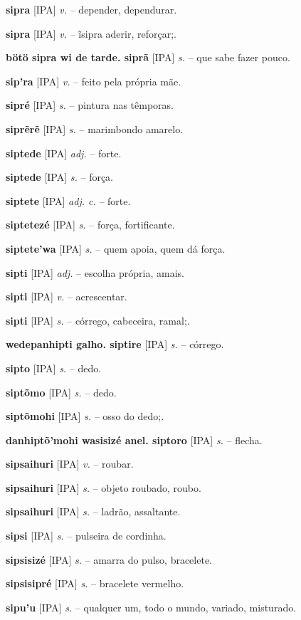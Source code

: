 \textbf{sipra} [IPA] \textit{v.} -- depender, dependurar.

\textbf{sipra} [IPA] \textit{v.} -- ĩsipra aderir, reforçar;.

\textbf{bötö sipra wi de tarde. siprã} [IPA] \textit{s.} -- que sabe fazer pouco.

\textbf{sip'ra} [IPA] \textit{v.} -- feito pela própria mãe.

\textbf{sipré} [IPA] \textit{s.} -- pintura nas têmporas.

\textbf{siprẽrẽ} [IPA] \textit{s.} -- marimbondo amarelo.

\textbf{siptede} [IPA] \textit{adj.} -- forte.

\textbf{siptede} [IPA] \textit{s.} -- força.

\textbf{siptete} [IPA] \textit{adj. c.} -- forte.

\textbf{siptetezé} [IPA] \textit{s.} -- força, fortificante.

\textbf{siptete'wa} [IPA] \textit{s.} -- quem apoia, quem dá força.

\textbf{sipti} [IPA] \textit{adj.} -- escolha própria, amais.

\textbf{sipti} [IPA] \textit{v.} -- acrescentar.

\textbf{sipti} [IPA] \textit{s.} -- córrego, cabeceira, ramal;.

\textbf{wedepanhipti galho. siptire} [IPA] \textit{s.} -- córrego.

\textbf{sipto} [IPA] \textit{s.} -- dedo.

\textbf{siptõmo} [IPA] \textit{s.} -- dedo.

\textbf{siptõmohi} [IPA] \textit{s.} -- osso do dedo;.

\textbf{danhiptõ'mohi wasisizé anel. siptoro} [IPA] \textit{s.} -- flecha.

\textbf{sipsaihuri} [IPA] \textit{v.} -- roubar.

\textbf{sipsaihuri} [IPA] \textit{s.} -- objeto roubado, roubo.

\textbf{sipsaihuri} [IPA] \textit{s.} -- ladrão, assaltante.

\textbf{sipsi} [IPA] \textit{s.} -- pulseira de cordinha.

\textbf{sipsisizé} [IPA] \textit{s.} -- amarra do pulso, bracelete.

\textbf{sipsisipré} [IPA] \textit{s.} -- bracelete vermelho.

\textbf{sipu'u} [IPA] \textit{s.} -- qualquer um, todo o mundo, variado, misturado.


